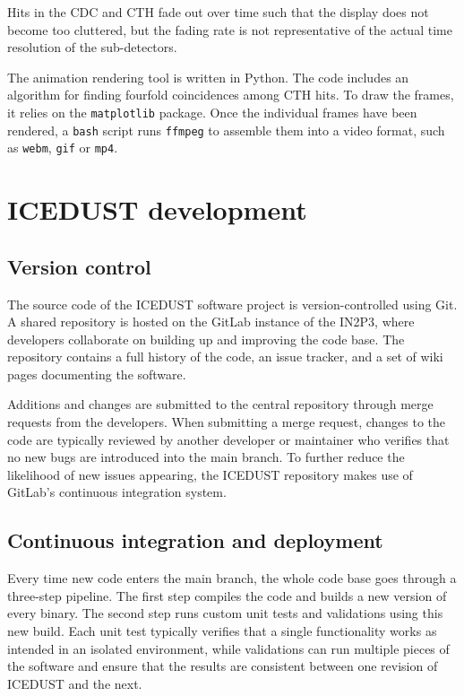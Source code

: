Hits in the CDC and CTH fade out over time such that the display does not become
too cluttered, but the fading rate is not representative of the actual time
resolution of the sub-detectors.

The animation rendering tool is written in Python. The code includes an
algorithm for finding fourfold coincidences among CTH hits. To draw the frames,
it relies on the \texttt{matplotlib} package. Once the individual frames have
been rendered, a \texttt{bash} script runs \texttt{ffmpeg} to assemble them into
a video format, such as \texttt{webm}, \texttt{gif} or \texttt{mp4}.


\section{ICEDUST development}

\subsection{Version control}

The source code of the ICEDUST software project is version-controlled using Git.
A shared repository is hosted on the GitLab instance of the IN2P3, where
developers collaborate on building up and improving the code base. The
repository contains a full history of the code, an issue tracker, and a set of
wiki pages documenting the software. 

Additions and changes are submitted to the central repository through merge
requests from the developers. When submitting a merge request, changes to the
code are typically reviewed by another developer or maintainer who verifies that
no new bugs are introduced into the main branch. To further reduce the
likelihood of new issues appearing, the ICEDUST repository makes use of GitLab's
continuous integration system.

\subsection{Continuous integration and deployment}

Every time new code enters the main branch, the whole code base goes through a
three-step pipeline. The first step compiles the code and builds a new version
of every binary. The second step runs custom unit tests and validations using
this new build. Each unit test typically verifies that a single functionality
works as intended in an isolated environment, while validations can run multiple
pieces of the software and ensure that the results are consistent between one
revision of ICEDUST and the next.

